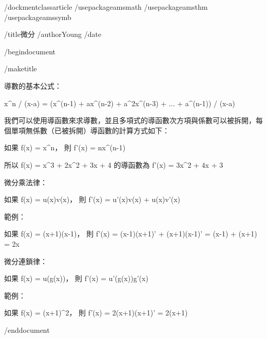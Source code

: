 /dockmentclass{article}
/usepackage{amsmath}
/usepackage{amsthm}
/usepackage{amssymb}

/title{微分}
/author{Young}
/date{}

/begin{document}

/maketitle

導數的基本公式：

x^n / (x-a) = (x^(n-1) + ax^(n-2) + a^2x^(n-3) + ... + a^(n-1)) / (x-a)

我們可以使用導函數來求導數，並且多項式的導函數次方項與係數可以被拆開，每個單項無係數（已被拆開）導函數的計算方式如下：

如果 f(x) = x^n， 則 f'(x) = nx^(n-1)

所以 f(x) = x^3 + 2x^2 + 3x + 4 的導函數為 f'(x) = 3x^2 + 4x + 3

微分乘法律：

如果 f(x) = u(x)v(x)， 則 f'(x) = u'(x)v(x) + u(x)v'(x)

範例：

如果 f(x) = (x+1)(x-1)， 則 f'(x) = (x-1)(x+1)' + (x+1)(x-1)' = (x-1) + (x+1) = 2x

微分連鎖律：

如果 f(x) = u(g(x))， 則 f'(x) = u'(g(x))g'(x)

範例：

如果 f(x) = (x+1)^2， 則 f'(x) = 2(x+1)(x+1)' = 2(x+1)

/end{document}

